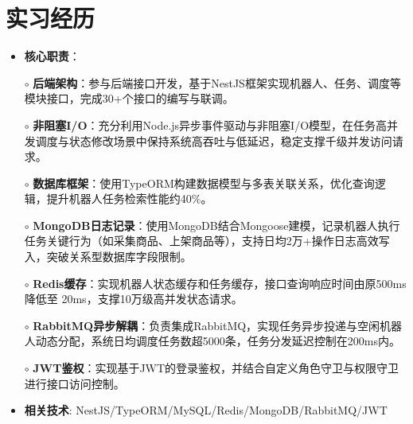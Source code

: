 \documentclass{resume}
\begin{document}
\section{实习经历}
    \begin{normalsize}
      \begin{itemize}
        \item \textbf{核心职责}：
        \setlength{\itemindent}{1em} %
          \item[$\circ$] \textbf{后端架构}：参与后端接口开发，基于NestJS框架实现机器人、任务、调度等模块接口，完成30+个接口的编写与联调。
          \item[$\circ$] \textbf{非阻塞I/O}：充分利用Node.js异步事件驱动与非阻塞I/O模型，在任务高并发调度与状态修改场景中保持系统高吞吐与低延迟，稳定支撑千级并发访问请求。
          \item[$\circ$] \textbf{数据库框架}：使用TypeORM构建数据模型与多表关联关系，优化查询逻辑，提升机器人任务检索性能约40\%。
          \item[$\circ$] \textbf{MongoDB日志记录}：使用MongoDB结合Mongoose建模，记录机器人执行任务关键行为（如采集商品、上架商品等），支持日均2万+操作日志高效写入，突破关系型数据库字段限制。
          \item[$\circ$] \textbf{Redis缓存}：实现机器人状态缓存和任务缓存，接口查询响应时间由原500ms降低至 20ms，支撑10万级高并发状态请求。
          \item[$\circ$] \textbf{RabbitMQ异步解耦​​}：负责集成RabbitMQ，实现任务异步投递与空闲机器人动态分配，系统日均调度任务数超5000条，任务分发延迟控制在200ms内。
          \item[$\circ$] \textbf{JWT鉴权}：实现基于JWT的登录鉴权，并结合自定义角色守卫与权限守卫进行接口访问控制。
        \setlength{\itemindent}{0em} %
        \item \textbf{相关技术}: NestJS/TypeORM/MySQL/Redis/MongoDB/RabbitMQ/JWT
        \end{itemize}
    \end{normalsize}
\end{document}

